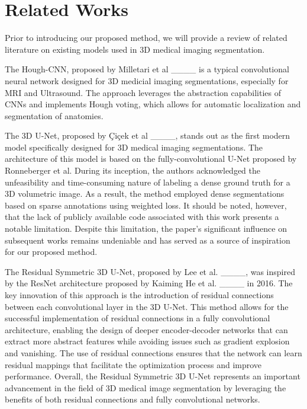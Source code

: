 \section{Related Works}
Prior to introducing our proposed method, we will provide a review of related literature on existing models used in 3D medical imaging segmentation.

The Hough-CNN, proposed by Milletari et al ____ is a typical convolutional neural network designed for 3D medicial imaging segmentations, especially for MRI and Ultrasound. The approach leverages the abstraction capabilities of CNNs and implements Hough voting, which allows for automatic localization and segmentation of anatomies. 

The 3D U-Net, proposed by Çiçek et al ____, stands out as the first modern model specifically designed for 3D medical imaging segmentations. The architecture of this model is based on the fully-convolutional U-Net proposed by Ronneberger et al. During its inception, the authors acknowledged the unfeasibility and time-consuming nature of labeling a dense ground truth for a 3D volumetric image. As a result, the method employed dense segmentations based on sparse annotations using weighted loss. It should be noted, however, that the lack of publicly available code associated with this work presents a notable limitation. Despite this limitation, the paper's significant influence on subsequent works remains undeniable and has served as a source of inspiration for our proposed method.

The Residual Symmetric 3D U-Net, proposed by Lee et al. ____, was inspired by the ResNet architecture proposed by Kaiming He et al. ____ in 2016. The key innovation of this approach is the introduction of residual connections between each convolutional layer in the 3D U-Net. This method allows for the successful implementation of residual connections in a fully convolutional architecture, enabling the design of deeper encoder-decoder networks that can extract more abstract features while avoiding issues such as gradient explosion and vanishing. The use of residual connections ensures that the network can learn residual mappings that facilitate the optimization process and improve performance. Overall, the Residual Symmetric 3D U-Net represents an important advancement in the field of 3D medical image segmentation by leveraging the benefits of both residual connections and fully convolutional networks.

